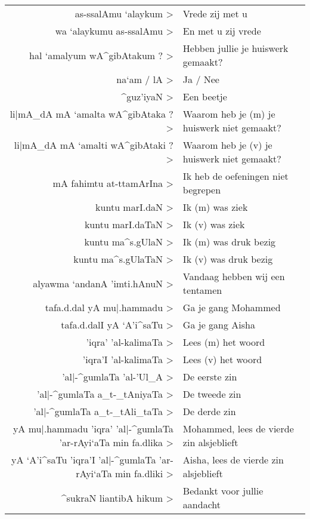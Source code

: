 \documentclass[a4paper]{article}
\begin{document}
\setarab \fullvocalize

\begin{center}
\begin{tabular}{rl}
\< as-ssalAmu `alaykum >
& Vrede zij met u
\\
\< wa `alaykumu as-ssalAmu >
& En met u zij vrede
\\
\< hal `amalyum wA^gibAtakum ? >
& Hebben jullie je huiswerk gemaakt?
\\
\< na`am / lA >
& Ja / Nee
\\
\< ^guz'iyaN >
& Een beetje
\\
\< li|mA_dA mA `amalta wA^gibAtaka ? >
& Waarom heb je (m) je huiswerk niet gemaakt?
\\
\< li|mA_dA mA `amalti wA^gibAtaki ? >
& Waarom heb je (v) je huiswerk niet gemaakt?
\\
\< mA fahimtu at-ttamArIna >
& Ik heb de oefeningen niet begrepen
\\
\< kuntu marI.daN >
& Ik (m) was ziek
\\
\< kuntu marI.daTaN >
& Ik (v) was ziek
\\
\< kuntu ma^s.gUlaN >
& Ik (m) was druk bezig
\\
\< kuntu ma^s.gUlaTaN >
& Ik (v) was druk bezig
\\
\< alyawma `andanA 'imti.hAnuN >
& Vandaag hebben wij een tentamen
\\
\< tafa.d.dal yA  mu|.hammadu >
& Ga je gang Mohammed
\\
\< tafa.d.dalI yA  `A'i^saTu >
& Ga je gang Aisha
\\
\< 'iqra' 'al-kalimaTa >
& Lees (m) het woord
\\
\< 'iqra'I 'al-kalimaTa >
& Lees (v) het woord
\\
\< 'al|-^gumlaTa 'al-'Ul_A >
& De eerste zin
\\
\< 'al|-^gumlaTa a_t-_tAniyaTa >
& De tweede zin
\\
\< 'al|-^gumlaTa a_t-_tAli_taTa >
& De derde zin
\\
\< yA mu|.hammadu 'iqra' 'al|-^gumlaTa 'ar-rAyi`aTa min fa.dlika >
& Mohammed, lees de vierde zin alsjeblieft
\\
\< yA `A'i^saTu 'iqra'I 'al|-^gumlaTa 'ar-rAyi`aTa min fa.dliki >
& Aisha, lees de vierde zin alsjeblieft
\\
\< ^sukraN liantibA hikum >
& Bedankt voor jullie aandacht
\end{tabular}
\end{center}
\end{document}
